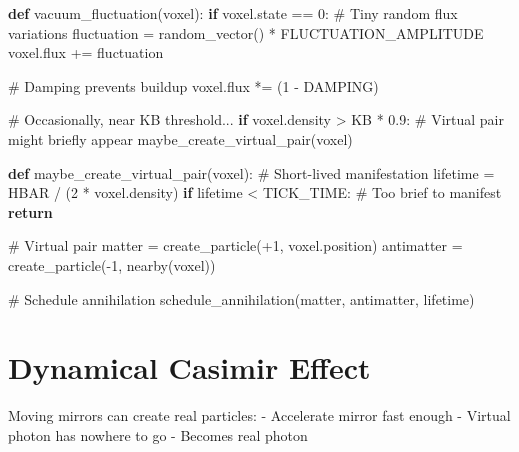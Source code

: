 \documentclass[
  11pt,
  letterpaper,
  twoside,
  openright]{book}
\newenvironment{Shaded}{\begin{snugshade}}{\end{snugshade}}
\newcommand{\CommentTok}[1]{\textcolor[rgb]{0.37,0.37,0.37}{#1}}
\newcommand{\ControlFlowTok}[1]{\textcolor[rgb]{0.00,0.23,0.31}{\textbf{#1}}}
\newcommand{\DecValTok}[1]{\textcolor[rgb]{0.68,0.00,0.00}{#1}}
\newcommand{\FloatTok}[1]{\textcolor[rgb]{0.68,0.00,0.00}{#1}}
\newcommand{\KeywordTok}[1]{\textcolor[rgb]{0.00,0.23,0.31}{\textbf{#1}}}
\newcommand{\NormalTok}[1]{\textcolor[rgb]{0.00,0.23,0.31}{#1}}
\newcommand{\OperatorTok}[1]{\textcolor[rgb]{0.37,0.37,0.37}{#1}}
\begin{document}
\begin{Shaded}
\begin{Highlighting}[]
\KeywordTok{def}\NormalTok{ vacuum\_fluctuation(voxel):}
    \ControlFlowTok{if}\NormalTok{ voxel.state }\OperatorTok{==} \DecValTok{0}\NormalTok{:}
        \CommentTok{\# Tiny random flux variations}
\NormalTok{        fluctuation }\OperatorTok{=}\NormalTok{ random\_vector() }\OperatorTok{*}\NormalTok{ FLUCTUATION\_AMPLITUDE}
\NormalTok{        voxel.flux }\OperatorTok{+=}\NormalTok{ fluctuation}

        \CommentTok{\# Damping prevents buildup}
\NormalTok{        voxel.flux }\OperatorTok{*=}\NormalTok{ (}\DecValTok{1} \OperatorTok{{-}}\NormalTok{ DAMPING)}

        \CommentTok{\# Occasionally, near KB threshold...}
        \ControlFlowTok{if}\NormalTok{ voxel.density }\OperatorTok{\textgreater{}}\NormalTok{ KB }\OperatorTok{*} \FloatTok{0.9}\NormalTok{:}
            \CommentTok{\# Virtual pair might briefly appear}
\NormalTok{            maybe\_create\_virtual\_pair(voxel)}

\KeywordTok{def}\NormalTok{ maybe\_create\_virtual\_pair(voxel):}
    \CommentTok{\# Short{-}lived manifestation}
\NormalTok{    lifetime }\OperatorTok{=}\NormalTok{ HBAR }\OperatorTok{/}\NormalTok{ (}\DecValTok{2} \OperatorTok{*}\NormalTok{ voxel.density)}
    \ControlFlowTok{if}\NormalTok{ lifetime }\OperatorTok{\textless{}}\NormalTok{ TICK\_TIME:}
        \CommentTok{\# Too brief to manifest}
        \ControlFlowTok{return}

    \CommentTok{\# Virtual pair}
\NormalTok{    matter }\OperatorTok{=}\NormalTok{ create\_particle(}\OperatorTok{+}\DecValTok{1}\NormalTok{, voxel.position)}
\NormalTok{    antimatter }\OperatorTok{=}\NormalTok{ create\_particle(}\OperatorTok{{-}}\DecValTok{1}\NormalTok{, nearby(voxel))}

    \CommentTok{\# Schedule annihilation}
\NormalTok{    schedule\_annihilation(matter, antimatter, lifetime)}
\end{Highlighting}
\end{Shaded}

\section{Dynamical Casimir Effect}\label{dynamical-casimir-effect}

Moving mirrors can create real particles: - Accelerate mirror fast
enough - Virtual photon has nowhere to go - Becomes real photon
\end{document}

